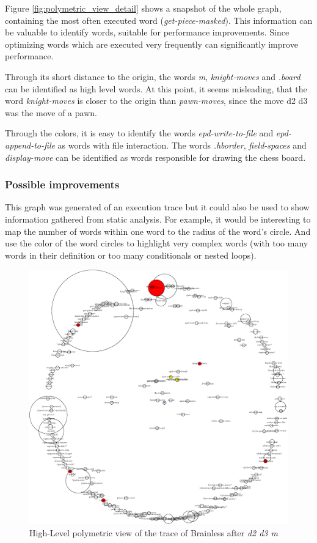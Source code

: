Figure \ref{fig:polymetric_view_detail} shows a snapshot of the whole graph, containing the most often executed word (\emph{get-piece-masked}). This information can be valuable to identify words, suitable for performance improvements. Since optimizing words which are executed very frequently can significantly improve performance.

Through its short distance to the origin, the words \emph{m}, \emph{knight-moves} and \emph{.board} can be identified as high level words. At this point, it seems misleading, that the word \emph{knight-moves} is closer to the origin than \emph{pawn-moves}, since the move d2 d3 was the move of a pawn.

Through the colors, it is easy to identify the words \emph{epd-write-to-file} and \emph{epd-append-to-file} as words with file interaction. The words \emph{.hborder}, \emph{field-spaces} and \emph{display-move} can be identified as words responsible for drawing the chess board.

\subsubsection*{Possible improvements}

This graph was generated of an execution trace but it could also be used to show information gathered from static analysis. For example, it would be interesting to map the number of words within one word to the radius of the word's circle. And use the color of the word circles to highlight very complex words (with too many words in their definition or too many conditionals or nested loops).

\begin{figure}[p]
    \centering
    \includegraphics[scale=0.55]{graphics/polymetric_view.png}
    \caption{High-Level polymetric view of the trace of Brainless after \emph{d2 d3 m}}
    \label{fig:polymetric_view}
\end{figure}

